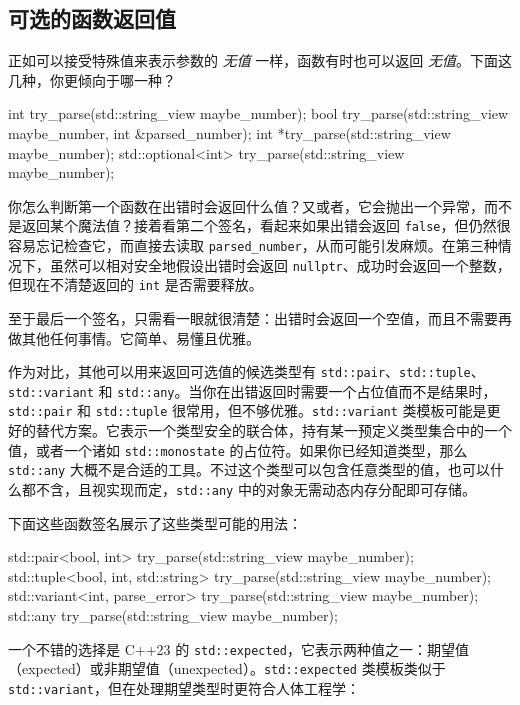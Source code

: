 \subsection{可选的函数返回值}

\label{idx:469}
正如可以接受特殊值来表示参数的 \emph{无值} 一样，函数有时也可以返回 \emph{无值}。下面这几种，你更倾向于哪一种？

\begin{codebox}[cpp]
int try_parse(std::string_view maybe_number);
bool try_parse(std::string_view maybe_number, int &parsed_number);
int *try_parse(std::string_view maybe_number);
std::optional<int> try_parse(std::string_view maybe_number);
\end{codebox}

你怎么判断第一个函数在出错时会返回什么值？又或者，它会抛出一个异常，而不是返回某个魔法值？接着看第二个签名，看起来如果出错会返回 \texttt{false}，但仍然很容易忘记检查它，而直接去读取 \texttt{parsed\_\allowbreak{}number}，从而可能引发麻烦。在第三种情况下，虽然可以相对安全地假设出错时会返回 \texttt{nullptr}、成功时会返回一个整数，但现在不清楚返回的 \texttt{int} 是否需要释放。

至于最后一个签名，只需看一眼就很清楚：出错时会返回一个空值，而且不需要再做其他任何事情。它简单、易懂且优雅。

\label{idx:470}
作为对比，其他可以用来返回可选值的候选类型有 \texttt{std::pair}、\texttt{std::\allowbreak{}tuple}、\texttt{std::\allowbreak{}variant} 和 \texttt{std::any}。当你在出错返回时需要一个占位值而不是结果时，\texttt{std::pair} 和 \texttt{std::\allowbreak{}tuple} 很常用，但不够优雅。\texttt{std::\allowbreak{}variant} 类模板可能是更好的替代方案。它表示一个类型安全的联合体，持有某一预定义类型集合中的一个值，或者一个诸如 \texttt{std::\allowbreak{}monostate} 的占位符。如果你已经知道类型，那么 \texttt{std::any} 大概不是合适的工具。不过这个类型可以包含任意类型的值，也可以什么都不含，且视实现而定，\texttt{std::any} 中的对象无需动态内存分配即可存储。

下面这些函数签名展示了这些类型可能的用法：

\begin{codebox}[cpp]
std::pair<bool, int> try_parse(std::string_view maybe_number);
std::tuple<bool, int, std::string> try_parse(std::string_view maybe_number);
std::variant<int, parse_error> try_parse(std::string_view maybe_number);
std::any try_parse(std::string_view maybe_number);
\end{codebox}

一个不错的选择是 C++23 的 \texttt{std::\allowbreak{}expected}，它表示两种值之一：期望值（expected）或非期望值（unexpected）。\texttt{std::\allowbreak{}expected} 类模板类似于 \texttt{std::\allowbreak{}variant}，但在处理期望类型时更符合人体工程学：

